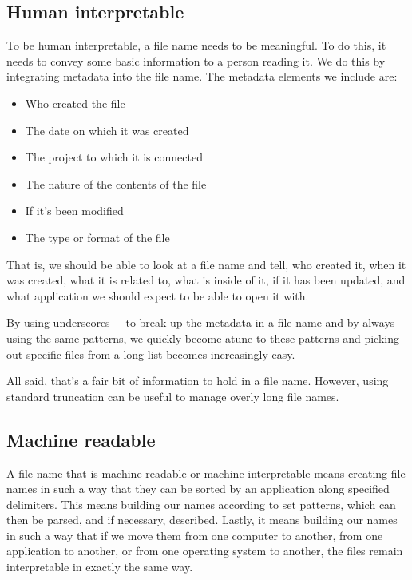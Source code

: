 \documentclass[
]{book}
\providecommand{\tightlist}{%
  \setlength{\itemsep}{0pt}\setlength{\parskip}{0pt}}
\begin{document}
\hypertarget{human-interpretable}{%
\subsection*{Human interpretable}\label{human-interpretable}}

To be human interpretable, a file name needs to be meaningful. To do this, it needs to convey some basic information to a person reading it. We do this by integrating metadata into the file name. The metadata elements we include are:

\begin{itemize}
\tightlist
\item
  Who created the file
\item
  The date on which it was created
\item
  The project to which it is connected
\item
  The nature of the contents of the file
\item
  If it's been modified
\item
  The type or format of the file
\end{itemize}

That is, we should be able to look at a file name and tell, who created it, when it was created, what it is related to, what is inside of it, if it has been updated, and what application we should expect to be able to open it with.

By using underscores \_ to break up the metadata in a file name and by always using the same patterns, we quickly become atune to these patterns and picking out specific files from a long list becomes increasingly easy.

All said, that's a fair bit of information to hold in a file name. However, using standard truncation can be useful to manage overly long file names.

\hypertarget{machine-readable}{%
\subsection*{Machine readable}\label{machine-readable}}

A file name that is machine readable or machine interpretable means creating file names in such a way that they can be sorted by an application along specified delimiters. This means building our names according to set patterns, which can then be parsed, and if necessary, described. Lastly, it means building our names in such a way that if we move them from one computer to another, from one application to another, or from one operating system to another, the files remain interpretable in exactly the same way.
\end{document}
